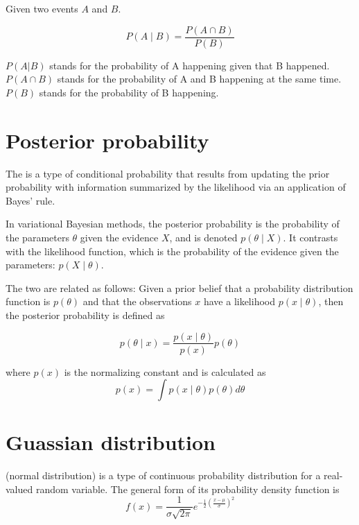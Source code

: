 Given two events \(A\) and \(B\).

\begin{equation}
  \label{eq:19}
  P(A \mid B)=\frac{P(A \cap B)}{P(B)}
\end{equation}

\(P(A|B)\) stands for the probability of A happening given that B happened.
\(P(A \cap B)\) stands for the probability of A and B happening at the same time.
\(P(B)\) stands for the probability of B happening.
\section{Posterior probability}
\label{sec:post-prob}

The  is a type of conditional probability that results from updating the prior probability with information summarized by the likelihood via an application of Bayes' rule.

In variational Bayesian methods, the posterior probability is the probability of the parameters $\theta$ given the evidence $X$, and is denoted $p(\theta \mid X)$.
It contrasts with the likelihood function, which is the probability of the evidence given the parameters: $p(X \mid \theta)$.

The two are related as follows:
Given a prior belief that a probability distribution function is $p(\theta)$ and that the observations $x$ have a likelihood $p(x \mid \theta)$, then the posterior probability is defined as

\begin{equation}
  \label{eq:20}
  p(\theta \mid x)=\frac{p(x \mid \theta)}{p(x)} p(\theta)  
\end{equation}

where $p(x)$ is the normalizing constant and is calculated as
\begin{equation}
  \label{eq:21}
  p(x)=\int p(x \mid \theta) p(\theta) d \theta  
\end{equation}




\section{Guassian distribution}
\label{sec:guass-distr}


 (normal distribution) is a type of continuous probability distribution for a real-valued random variable.
The general form of its probability density function is
\begin{equation}
  \label{eq:22}
  f(x)=\frac{1}{\sigma \sqrt{2 \pi}} e^{-\frac{1}{2}\left(\frac{x-\mu}{\sigma}\right)^2}  
\end{equation}


